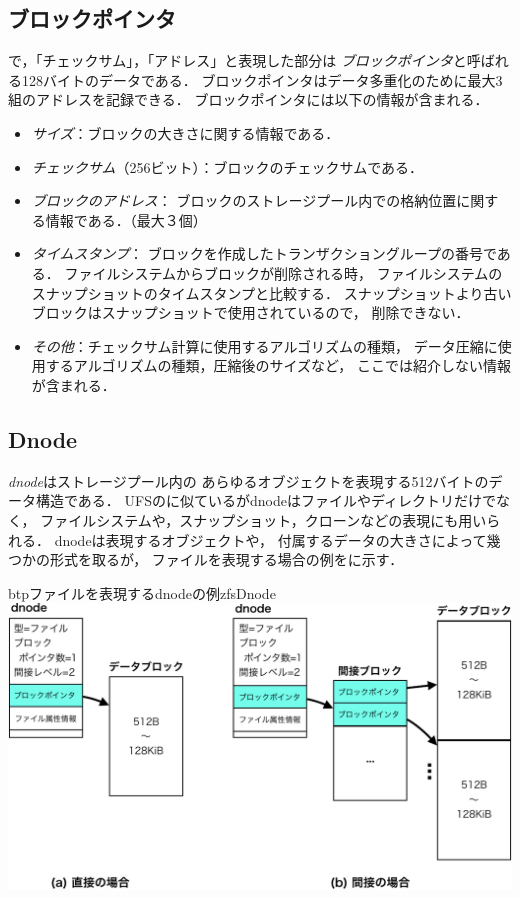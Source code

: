 \subsection{ブロックポインタ}
で，「チェックサム」，「アドレス」と表現した部分は
\emph{ブロックポインタ}と呼ばれる128バイトのデータである．
ブロックポインタはデータ多重化のために最大3組のアドレスを記録できる．
ブロックポインタには以下の情報が含まれる．
\begin{itemize}
\item \emph{サイズ}：ブロックの大きさに関する情報である．
\item \emph{チェックサム}（256ビット）：ブロックのチェックサムである．
\item \emph{ブロックのアドレス}：
  ブロックのストレージプール内での格納位置に関する情報である．（最大３個）
\item \emph{タイムスタンプ}：
  ブロックを作成したトランザクショングループの番号である．
  ファイルシステムからブロックが削除される時，
  ファイルシステムのスナップショットのタイムスタンプと比較する．
  スナップショットより古いブロックはスナップショットで使用されているので，
  削除できない．
\item \emph{その他}：チェックサム計算に使用するアルゴリズムの種類，
  データ圧縮に使用するアルゴリズムの種類，圧縮後のサイズなど，
  ここでは紹介しない情報が含まれる．
\end{itemize}

\subsection{Dnode}
\emph{dnode}はストレージプール内の
あらゆるオブジェクトを表現する512バイトのデータ構造である．
UFSの{\inode}に似ているがdnodeはファイルやディレクトリだけでなく，
ファイルシステムや，スナップショット，クローンなどの表現にも用いられる．
dnodeは表現するオブジェクトや，
付属するデータの大きさによって幾つかの形式を取るが，
ファイルを表現する場合の例をに示す．

\begin{myfig}{btp}{ファイルを表現するdnodeの例}{zfsDnode}
  \centering\includegraphics[scale=0.75]{Fig/zfsDnode-crop.pdf}
\end{myfig}

